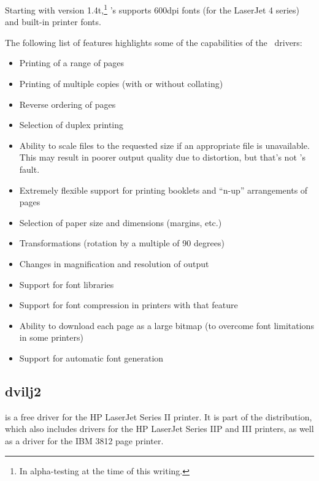 
Starting with version 1.4t,\footnote{In alpha-testing at the time of this
writing.} \emTeX's  supports 600dpi fonts (for the
LaserJet 4 series) and built-in printer fonts.

The following list of features highlights some of the capabilities of the
\emTeX\ drivers:

\begin{itemize}
  \item Printing of a range of pages
  \item Printing of multiple copies (with or without collating)
  \item Reverse ordering of pages
  \item Selection of duplex printing
  \item Ability to scale  files to the requested size if an appropriate
         file is unavailable.  This may result in poorer output
        quality due to distortion, but that's not \emTeX's
        fault.
  \item Extremely flexible support for printing booklets and ``n-up''
        arrangements of pages
  \item Selection of paper size and dimensions (margins, etc.)
  \item Transformations (rotation by a multiple of 90 degrees)
  \item Changes in magnification and resolution of output
  \item Support for font libraries
  \item Support for font compression in printers with that feature
  \item Ability to download each page as a large bitmap (to overcome font
        limitations in some printers)
  \item Support for automatic font generation
\end{itemize}

\subsection{dvilj2}

 is a free driver for the HP LaserJet Series II printer.
It is part of the  distribution, which also includes drivers
for the HP LaserJet Series IIP and III printers, as well as a driver for the
IBM 3812 page printer.

